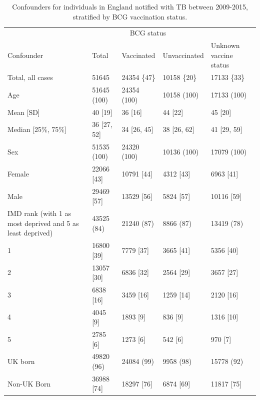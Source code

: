 \documentclass[11pt,twoside]{bristolthesis}
\begin{document}
  \begin{table}[H]
  
  \caption{\label{tab:06-demo-sum}Confounders for individuals in England notified with TB between 2009-2015,  stratified by BCG vaccination status.}
  \centering
  \fontsize{8}{10}\selectfont
  \begin{tabular}{>{\raggedright\arraybackslash}p{3cm}llll}
  \toprule
  \multicolumn{2}{c}{ } & \multicolumn{3}{c}{BCG status} \\
  \cmidrule(l{3pt}r{3pt}){3-5}
  Confounder & Total & Vaccinated & Unvaccinated & Unknown vaccine status\\
  \midrule
  Total, all cases & 51645 & 24354 \{47\} & 10158 \{20\} & 17133 \{33\}\\
  Age & 51645 (100) & 24354 (100) & 10158 (100) & 17133 (100)\\
  Mean [SD] & 40 [19] & 36 [16] & 44 [22] & 45 [20]\\
  Median [25\%, 75\%] & 36 [27, 52] & 34 [26, 45] & 38 [26, 62] & 41 [29, 59]\\
  Sex & 51535 (100) & 24320 (100) & 10136 (100) & 17079 (100)\\
  \addlinespace
  \hspace{1em}Female & 22066 [43] & 10791 [44] & 4312 [43] & 6963 [41]\\
  \hspace{1em}Male & 29469 [57] & 13529 [56] & 5824 [57] & 10116 [59]\\
  IMD rank (with 1 as most deprived and 5 as least deprived) & 43525 (84) & 21240 (87) & 8866 (87) & 13419 (78)\\
  \hspace{1em}1 & 16800 [39] & 7779 [37] & 3665 [41] & 5356 [40]\\
  \hspace{1em}2 & 13057 [30] & 6836 [32] & 2564 [29] & 3657 [27]\\
  \addlinespace
  \hspace{1em}3 & 6838 [16] & 3459 [16] & 1259 [14] & 2120 [16]\\
  \hspace{1em}4 & 4045 [9] & 1893 [9] & 836 [9] & 1316 [10]\\
  \hspace{1em}5 & 2785 [6] & 1273 [6] & 542 [6] & 970 [7]\\
  UK born & 49820 (96) & 24084 (99) & 9958 (98) & 15778 (92)\\
  \hspace{1em}Non-UK Born & 36988 [74] & 18297 [76] & 6874 [69] & 11817 [75]\\

\end{tabular}
\end{table}
\end{document}

